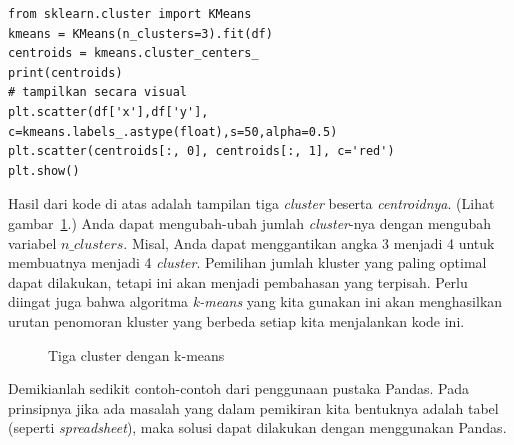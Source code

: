 \begin{verbatim}
from sklearn.cluster import KMeans
kmeans = KMeans(n_clusters=3).fit(df)
centroids = kmeans.cluster_centers_
print(centroids)
# tampilkan secara visual
plt.scatter(df['x'],df['y'], c=kmeans.labels_.astype(float),s=50,alpha=0.5)
plt.scatter(centroids[:, 0], centroids[:, 1], c='red')
plt.show()
\end{verbatim}

Hasil dari kode di atas adalah tampilan tiga {\em cluster}
beserta {\em centroidnya}.
(Lihat gambar~\ref{fig:3cluster-kmeans}.)
Anda dapat mengubah-ubah jumlah {\em cluster}-nya dengan mengubah
variabel $n\_clusters$. Misal, Anda dapat menggantikan angka 3 menjadi 4
untuk membuatnya menjadi 4 {\em cluster}.
Pemilihan jumlah kluster yang paling optimal dapat dilakukan, tetapi
ini akan menjadi pembahasan yang terpisah.
Perlu diingat juga bahwa algoritma {\em k-means} yang kita gunakan ini
akan menghasilkan urutan penomoran kluster yang berbeda
setiap kita menjalankan kode ini.

\begin{figure}[ht]
   \caption{Tiga cluster dengan k-means}
   \label{fig:3cluster-kmeans}
\end{figure}

Demikianlah sedikit contoh-contoh dari penggunaan pustaka Pandas.
Pada prinsipnya jika ada masalah yang dalam pemikiran kita bentuknya
adalah tabel (seperti {\em spreadsheet}), maka solusi dapat dilakukan
dengan menggunakan Pandas.




